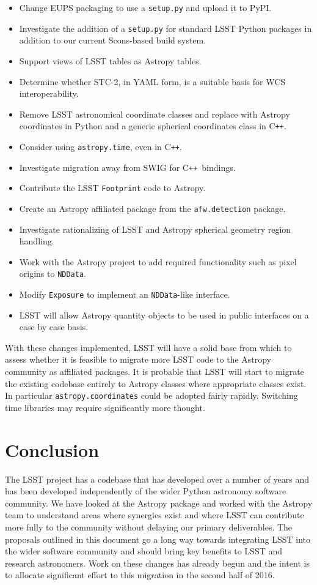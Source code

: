 \documentclass[]{spie}  %
\newcommand{\CPP}{C\texttt{++}\xspace}  %
\begin{document}
\begin{itemize}
\item Change EUPS packaging to use a \texttt{setup.py} and upload it to PyPI.
\item Investigate the addition of a \texttt{setup.py} for standard LSST Python packages in addition to our current Scons-based build system.
\item Support views of LSST tables as Astropy tables.
\item Determine whether STC-2, in YAML form, is a suitable basis for WCS interoperability.
\item Remove LSST astronomical coordinate classes and replace with Astropy coordinates in Python and a generic spherical coordinates class in \CPP.
\item Consider using \texttt{astropy.time}, even in \CPP.
\item Investigate migration away from SWIG for \CPP\ bindings.
\item Contribute the LSST \texttt{Footprint} code to Astropy.
\item Create an Astropy affiliated package from the \texttt{afw.detection} package.
\item Investigate rationalizing of LSST and Astropy spherical geometry region handling.
\item Work with the Astropy project to add required functionality such as pixel origins to \texttt{NDData}.
\item Modify \texttt{Exposure} to implement an \texttt{NDData}-like interface.
\item LSST will allow Astropy quantity objects to be used in public interfaces on a case by case basis.

\end{itemize}

With these changes implemented, LSST will have a solid base from which to assess whether it is feasible to migrate more LSST code to the Astropy community as affiliated packages.
It is probable that LSST will start to migrate the existing codebase entirely to Astropy classes where appropriate classes exist.
In particular \texttt{astropy.coordinates} could be adopted fairly rapidly.
Switching time libraries may require significantly more thought.

\section{Conclusion}

The LSST project has a codebase that has developed over a number of years and has been developed independently of the wider Python astronomy software community.
We have looked at the Astropy package and worked with the Astropy team to understand areas where synergies exist and where LSST can contribute more fully to the community without delaying our primary deliverables.
The proposals outlined in this document go a long way towards integrating LSST into the wider software community and should bring key benefits to LSST and research astronomers.
Work on these changes has already begun and the intent is to allocate significant effort to this migration in the second half of 2016.
\end{document}
